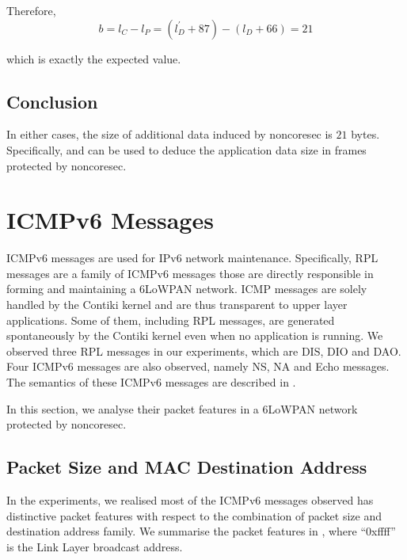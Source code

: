 Therefore, 
\begin{equation}
	b = l_C - l_P = (l^{\prime}_D + 87) - (l_D + 66) = 21
\end{equation}

which is exactly the expected value.

\subsection{Conclusion}

In either cases, the size of additional data induced by noncoresec is $21$ bytes. Specifically,  and  can be used to deduce the application data size in frames protected by noncoresec.

\section{ICMPv6 Messages}

ICMPv6 messages are used for IPv6 network maintenance. Specifically, RPL messages are a family of ICMPv6 messages those are directly responsible in forming and maintaining a 6LoWPAN network. ICMP messages are solely handled by the Contiki kernel and are thus transparent to  upper layer applications. Some of them, including RPL messages, are generated spontaneously by the Contiki kernel even when no application is running. We observed three RPL messages in our experiments, which are DIS, DIO and DAO. Four ICMPv6 messages are also observed, namely NS, NA and Echo messages. The semantics of these ICMPv6 messages are described in .

In this section, we analyse their packet features in a 6LoWPAN network protected by noncoresec.

\subsection{Packet Size and MAC Destination Address} \label{Size and Dst of ICMP}

In the experiments, we realised most of the ICMPv6 messages observed has distinctive packet features with respect to the combination of packet size and destination address family. We summarise the packet features in , where ``0xffff'' is the Link Layer broadcast address.

